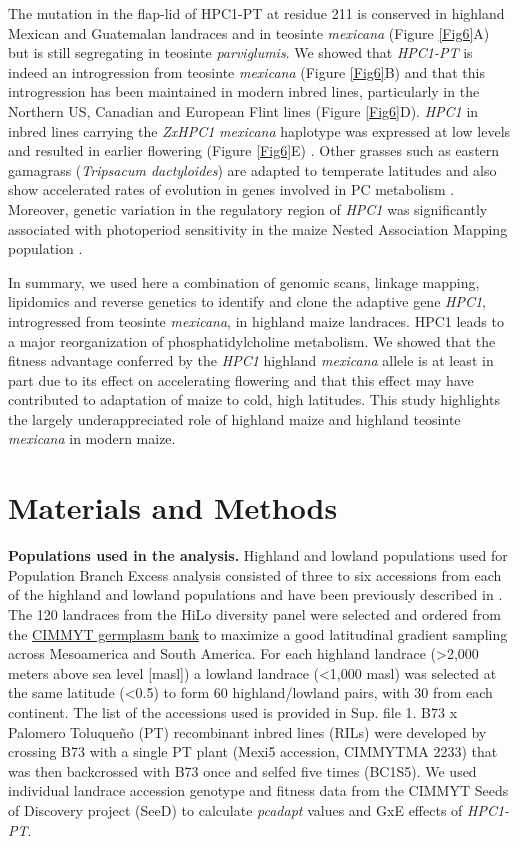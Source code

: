 \documentclass[9pt,twocolumn,twoside,lineno]{biorxiv}
\begin{document}
The mutation in the flap-lid of HPC1-PT at residue 211 is conserved in highland Mexican and Guatemalan landraces and in teosinte \textit{mexicana} (Figure \ref{Fig6}A) but is still segregating in teosinte \textit{parviglumis}. 
We showed that \textit{HPC1-PT} is  indeed an introgression from teosinte \textit{mexicana} (Figure \ref{Fig6}B) and that this introgression has been maintained in modern inbred lines, particularly in the Northern US, Canadian and European Flint lines (Figure \ref{Fig6}D). 
\textit{HPC1} in inbred lines carrying the \textit{ZxHPC1} \textit{mexicana} haplotype was expressed at low levels and resulted in earlier flowering (Figure \ref{Fig6}E) \cite{Kremling2018-gn}. 
Other grasses such as eastern gamagrass (\textit{Tripsacum dactyloides}) are adapted to temperate latitudes and also show accelerated rates of evolution in genes involved in PC metabolism \cite{Yan2019-tx}.
Moreover, genetic variation in the regulatory region of \textit{HPC1} was significantly associated with photoperiod sensitivity in the maize Nested Association Mapping population \cite{Hung2012-ms}. 

In summary, we used here a combination of genomic scans, linkage mapping, lipidomics and reverse genetics to identify and clone the adaptive gene \textit{HPC1}, introgressed from teosinte  \textit{mexicana}, in highland maize landraces. HPC1 leads to a major reorganization of phosphatidylcholine metabolism. 
We showed that the fitness advantage conferred by the \textit{HPC1} highland \textit{mexicana} allele is at least in part due to its effect on accelerating flowering and that this effect may have contributed to adaptation of maize to cold, high latitudes. 
This study highlights the largely underappreciated role of highland maize and highland teosinte \textit{mexicana} in modern maize.

\section{Materials and Methods}
\label{sec:materials:methods}
\textbf{Populations used in the analysis.} 
Highland and lowland populations used for Population Branch Excess analysis consisted of three to six accessions from each of the highland and lowland populations and have been previously described in \cite{Wang2020-mp, Wang2017-bc}. 
The 120 landraces from the HiLo diversity panel were selected and ordered from the \href{http://mgb.cimmyt.org/gringlobal/search.aspx}{CIMMYT germplasm bank} to maximize a good latitudinal gradient sampling across Mesoamerica and South America. 
For each highland landrace (>2,000 meters above sea level [masl]) a lowland landrace (<1,000 masl) was selected at the same latitude (<0.5\degree) to form 60 highland/lowland pairs, with 30 from each continent. 
The list of the accessions used is provided in Sup. file 1.   
B73 x Palomero Toluqueño (PT) recombinant inbred lines (RILs) were developed by crossing B73 with a single PT plant (Mexi5 accession, CIMMYTMA 2233) that was then backcrossed with B73 once and selfed five times (BC1S5).  
We used  individual landrace accession genotype and fitness data from the CIMMYT Seeds of Discovery project (SeeD) \cite{Gates2019-xu} to calculate \textit{pcadapt} \cite{Luu2017-ws} values and GxE effects of \textit{HPC1-PT}.
\end{document}
